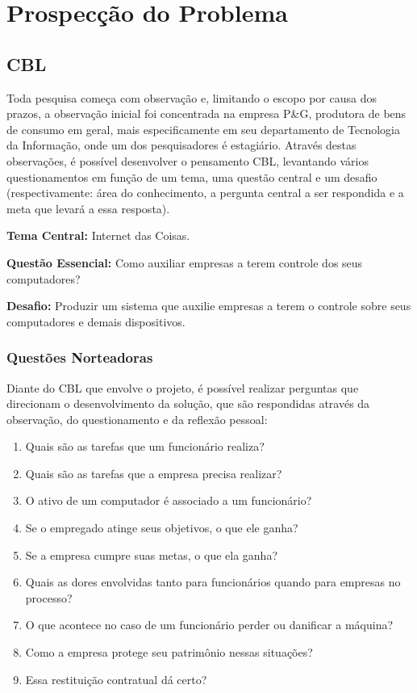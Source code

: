 \documentclass[
	12pt,				%
	openright,			%
	twoside,			%
	a4paper,			%
	english,			%
	french,				%
	spanish,			%
	brazil				%
	]{abntex2}
\begin{document}
\part{Prospecção do Problema}

\chapter{CBL}

Toda pesquisa começa com observação e, limitando o escopo por causa dos prazos, a observação inicial foi concentrada na empresa P\&G, produtora de bens de consumo em geral, mais especificamente em seu departamento de Tecnologia da Informação, onde um dos pesquisadores é estagiário. Através destas observações, é possível desenvolver o pensamento CBL, levantando vários questionamentos em função de um tema, uma questão central e um desafio (respectivamente: área do conhecimento, a pergunta central a ser respondida e a meta que levará a essa resposta).

\textbf{Tema Central:} Internet das Coisas.

\textbf{Questão Essencial:} Como auxiliar empresas a terem controle dos seus computadores?

\textbf{Desafio:} Produzir um sistema que auxilie empresas a terem o controle sobre seus computadores e demais dispositivos.

\section{Questões Norteadoras}

Diante do CBL que envolve o projeto, é possível realizar perguntas que direcionam o desenvolvimento da solução, que são respondidas através da observação, do questionamento e da reflexão pessoal:

\begin{enumerate}
    \item Quais são as tarefas que um funcionário realiza? 
    \item Quais são as tarefas que a empresa precisa realizar?
    \item O ativo de um computador é associado a um funcionário?
    \item Se o empregado atinge seus objetivos, o que ele ganha?
    \item Se a empresa cumpre suas metas, o que ela ganha?
    \item Quais as dores envolvidas tanto para funcionários quando para empresas no processo?
    \item O que acontece no caso de um funcionário perder ou danificar a máquina?
    \item Como a empresa protege seu patrimônio nessas situações?
    \item Essa restituição contratual dá certo?
\end{enumerate}
\end{document}
